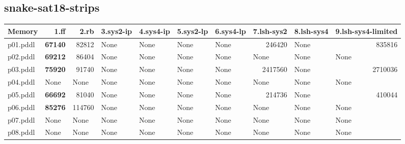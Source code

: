 \documentclass{article}
\begin{document}
\hypertarget{memory-snake-sat18-strips}{}
\subsection*{snake-sat18-strips}

\begin{tabular}{@{}lrrrrrrrrr@{}}
Memory & 1.ff & 2.rb & 3.sys2-ip & 4.sys4-ip & 5.sys2-lp & 6.sys4-lp & 7.lsh-sys2 & 8.lsh-sys4 & 9.lsh-sys4-limited \\
\midrule
p01.pddl & \textbf{67140} & 82812 & \multicolumn{1}{|l|}{None} & \multicolumn{1}{|l|}{None} & \multicolumn{1}{|l|}{None} & \multicolumn{1}{|l|}{None} & 246420 & \multicolumn{1}{|l|}{None} & 835816 \\
p02.pddl & \textbf{69212} & 86404 & \multicolumn{1}{|l|}{None} & \multicolumn{1}{|l|}{None} & \multicolumn{1}{|l|}{None} & \multicolumn{1}{|l|}{None} & \multicolumn{1}{|l|}{None} & \multicolumn{1}{|l|}{None} & \multicolumn{1}{|l|}{None} \\
p03.pddl & \textbf{75920} & 91740 & \multicolumn{1}{|l|}{None} & \multicolumn{1}{|l|}{None} & \multicolumn{1}{|l|}{None} & \multicolumn{1}{|l|}{None} & 2417560 & \multicolumn{1}{|l|}{None} & 2710036 \\
p04.pddl & \multicolumn{1}{|l|}{None} & \multicolumn{1}{|l|}{None} & \multicolumn{1}{|l|}{None} & \multicolumn{1}{|l|}{None} & \multicolumn{1}{|l|}{None} & \multicolumn{1}{|l|}{None} & \multicolumn{1}{|l|}{None} & \multicolumn{1}{|l|}{None} & \multicolumn{1}{|l|}{None} \\
p05.pddl & \textbf{66692} & 81040 & \multicolumn{1}{|l|}{None} & \multicolumn{1}{|l|}{None} & \multicolumn{1}{|l|}{None} & \multicolumn{1}{|l|}{None} & 214736 & \multicolumn{1}{|l|}{None} & 410044 \\
p06.pddl & \textbf{85276} & 114760 & \multicolumn{1}{|l|}{None} & \multicolumn{1}{|l|}{None} & \multicolumn{1}{|l|}{None} & \multicolumn{1}{|l|}{None} & \multicolumn{1}{|l|}{None} & \multicolumn{1}{|l|}{None} & \multicolumn{1}{|l|}{None} \\
p07.pddl & \multicolumn{1}{|l|}{None} & \multicolumn{1}{|l|}{None} & \multicolumn{1}{|l|}{None} & \multicolumn{1}{|l|}{None} & \multicolumn{1}{|l|}{None} & \multicolumn{1}{|l|}{None} & \multicolumn{1}{|l|}{None} & \multicolumn{1}{|l|}{None} & \multicolumn{1}{|l|}{None} \\
p08.pddl & \multicolumn{1}{|l|}{None} & \multicolumn{1}{|l|}{None} & \multicolumn{1}{|l|}{None} & \multicolumn{1}{|l|}{None} & \multicolumn{1}{|l|}{None} & \multicolumn{1}{|l|}{None} & \multicolumn{1}{|l|}{None} & \multicolumn{1}{|l|}{None} & \multicolumn{1}{|l|}{None} \\

\end{tabular}
\end{document}
